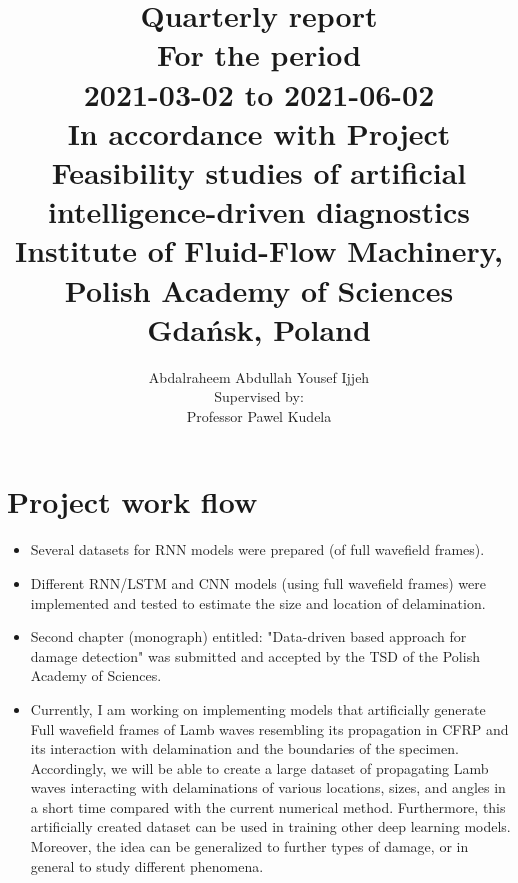 \documentclass[11pt,a4paper]{report}
\author{Abdalraheem Abdullah Yousef Ijjeh \\
	Supervised by: \\
	Professor Pawel Kudela}
\title{\Huge Quarterly report \\
	\huge For the period \\ 2021-03-02 to 2021-06-02
	\\ \Large In accordance with Project\\
	Feasibility studies of artificial intelligence-driven diagnostics\\ Institute of Fluid-Flow Machinery, Polish Academy of Sciences
	\\ Gdańsk, Poland}
\begin{document}
	\maketitle
	\newpage
	\section{Project work flow}
	\begin{itemize}
		\item Several datasets for RNN models were prepared (of full wavefield frames).
		\item Different RNN/LSTM and CNN models (using full wavefield frames) were implemented and tested to estimate the size and location of delamination.
		\item Second chapter (monograph) entitled: "Data-driven based approach for damage
		detection" was submitted and accepted by the TSD of the Polish Academy of Sciences.	
		\item Currently, I am working on implementing models that artificially generate Full wavefield frames of Lamb waves resembling its propagation in CFRP and its interaction with delamination and the boundaries of the specimen.
		Accordingly, we will be able to create a large dataset of propagating Lamb waves interacting with delaminations of various locations, sizes, and angles in a short time compared with the current numerical method.
		Furthermore, this artificially created dataset can be used in training other deep learning models.
		Moreover, the idea can be generalized to further types of damage, or in general to study different phenomena.
	\end{itemize}
%	
%	
\end{document}
